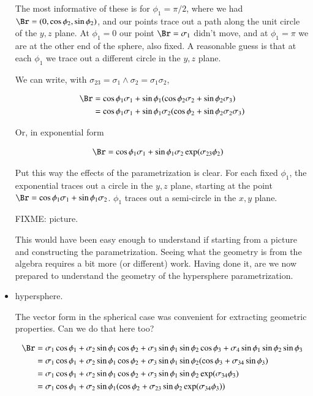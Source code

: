 \begin{itemize}
The most informative of these is for $\phi_1 = \pi/2$, where we had $\Br = (0, \cos\phi_2, \sin\phi_2)$, and our points trace out a path along the unit circle of the $y,z$ plane.  At $\phi_1 = 0$ our point $\Br = \sigma_1$ didn't move, and at $\phi_1 = \pi$ we are at the other end of the sphere, also fixed.  A reasonable guess is that at each $\phi_1$ we trace out a different circle in the $y,z$ plane.

We can write, with $\sigma_{23} = \sigma_1 \wedge \sigma_2 = \sigma_1 \sigma_2$,

\begin{align*}
\Br 
&= \cos\phi_1 \sigma_1 + \sin\phi_1 ( \cos\phi_2 \sigma_2 + \sin\phi_2 \sigma_3 ) \\
&= \cos\phi_1 \sigma_1 + \sin\phi_1 \sigma_2 ( \cos\phi_2 + \sin\phi_2 \sigma_2 \sigma_3 ) \\
\end{align*}

Or, in exponential form

\begin{align}\label{eqn:nvolume:sphereVec}
\Br &= \cos\phi_1 \sigma_1 + \sin\phi_1 \sigma_2 \exp( \sigma_{23} \phi_2 )
\end{align}

Put this way the effects of the parametrization is clear.   For each fixed $\phi_1$, the exponential traces out a circle in the $y,z$ plane, starting at the point $\Br = \cos\phi_1 \sigma_1 + \sin\phi_1 \sigma_2$.  $\phi_1$ traces out a semi-circle in the $x,y$ plane.

FIXME: picture.

This would have been easy enough to understand if starting from a picture and constructing the parametrization.  Seeing what the 
geometry is from the algebra requires a bit more (or different) work.  Having done it, are we now prepared to understand the geometry 
of the hypersphere parametrization.

\item hypersphere.

The vector form in the spherical case was convenient for extracting geometric properties.  Can we do that here too?

\begin{align*}
\Br
&= \sigma_1 \cos\phi_1 + \sigma_2 \sin\phi_1 \cos\phi_2 + \sigma_3 \sin\phi_1 \sin\phi_2 \cos\phi_3 + \sigma_4 \sin\phi_1 \sin\phi_2 \sin\phi_3 \\
&= \sigma_1 \cos\phi_1 + \sigma_2 \sin\phi_1 \cos\phi_2 + \sigma_3 \sin\phi_1 \sin\phi_2 (\cos\phi_3 + \sigma_{34} \sin\phi_3) \\
&= \sigma_1 \cos\phi_1 + \sigma_2 \sin\phi_1 \cos\phi_2 + \sigma_3 \sin\phi_1 \sin\phi_2 \exp(\sigma_{34}\phi_3) \\
&= \sigma_1 \cos\phi_1 + \sigma_2 \sin\phi_1 (\cos\phi_2 + \sigma_{23} \sin\phi_2 \exp(\sigma_{34}\phi_3) ) \\
\end{align*}


\end{itemize}
